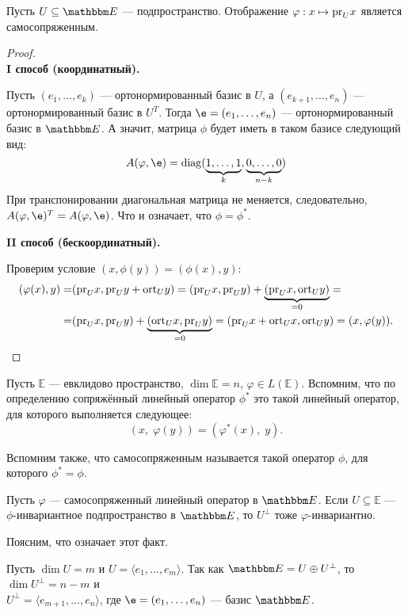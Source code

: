 \begin{Examples}
Пусть $U \subseteq \E$ --- подпространство. Отображение $\varphi : x \mapsto \mathrm{pr}_Ux$ является самосопряженным. 

\begin{proof}\ \\
\textbf{I способ (координатный).}

Пусть $(e_1, \ldots, e_k)$ --- ортонормированный базис в $U$, а $(e_{k+1}, \ldots, e_n)$ --- ортонормированный базис в $U^T$. Тогда $\e = (e_1, \ldots, e_n)$ --- ортонормированный базис в $\E$. А значит, матрица $\phi$ будет иметь в таком базисе следующий вид:
$$
A(\phi, \e) = \diag(\underbrace{1, \ldots, 1}_{k},\underbrace{0, \ldots, 0}_{n - k})
$$ 
При транспонировании диагональная матрица не меняется, следовательно, $A(\phi, \e)^T = A(\phi, \e)$. Что и означает, что $\phi = \phi^*$.

\textbf{II способ (бескоординатный).}

Проверим условие $(x, \phi(y)) = (\phi(x), y)$:
\begin{align*}
(\varphi(x), y) =& (\mathrm{pr}_Ux, \mathrm{pr}_Uy + \mathrm{ort}_Uy) = (\mathrm{pr}_Ux, \mathrm{pr}_Uy) + \underbrace{(\mathrm{pr}_Ux, \mathrm{ort}_Uy)}_{=0} = \\
=& (\mathrm{pr}_Ux, \mathrm{pr}_Uy) + \underbrace{(\mathrm{ort}_Ux, \mathrm{pr}_Uy)}_{=0} = (\mathrm{pr}_Ux + \mathrm{ort}_Ux, \mathrm{ort}_Uy) = (x, \varphi(y)).
\end{align*}
\end{proof}
\end{Examples}

Пусть $\mathbb{E}$ --- евклидово пространство, $\dim \mathbb{E} = n$, $\varphi \in L(\mathbb{E})$. Вспомним, что по определению сопряжённый линейный оператор $\phi^*$ это такой линейный оператор, для которого выполняется следующее:
$$
(x,\;\varphi(y)) = (\varphi^*(x),\; y).
$$

Вспомним также, что самосопряженным называется такой оператор $\phi$, для которого $\phi^* = \phi$.

\begin{Suggestion}
	Пусть $\varphi$ --- самосопряженный линейный оператор в $\E$. Если $U \subseteq \mathbb{E}$ ---\\ $\phi$-инвариантное подпространство в $\E$, то $U^\perp$ тоже $\varphi$-инвариантно.
\end{Suggestion}

Поясним, что означает этот факт.
	 
Пусть $\dim U = m$ и $U = \langle e_1, \ldots, e_m \rangle$. Так как $\E = U \oplus U^\perp$, то $\dim U^\perp = n - m$ и \\$U^\perp = \langle e_{m+1}, \ldots, e_n\rangle$, где $\e = (e_1, \ldots, e_n)$ --- базис $\E$.
	 
